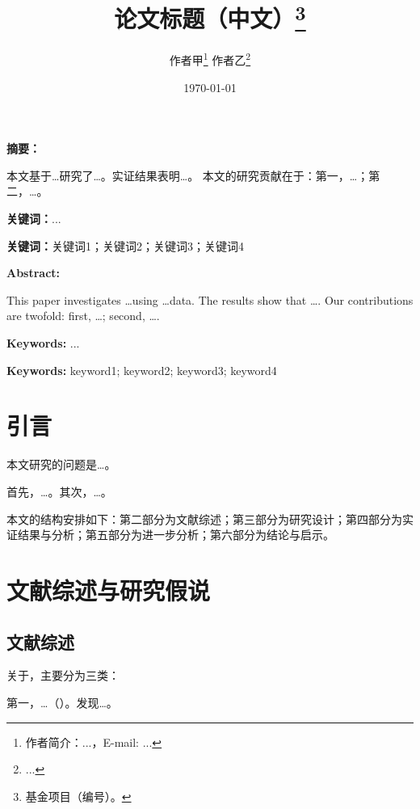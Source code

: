 \documentclass[lang=cn, alanguage={chinese}, aaffiliation={中国}, aoptions={authoryear}]{ctexart}
\title{论文标题（中文）\thanks{基金项目（编号）。}}
\author{作者甲\thanks{作者简介：...，E-mail: ...} \quad 作者乙\thanks{...}}
\date{\today}
\makeatletter
\newenvironment{cnabstract}{%
    \par\textbf{摘要：}
    \@tempswafalse
}{\par\vspace{\baselineskip}\par\textbf{关键词：}...}
\newenvironment{enabstract}{%
    \par\begin{minipage}{\textwidth}\textbf{Abstract: }
    }{%
    \end{minipage}\par\vspace{\baselineskip}\par\textbf{Keywords: }...}
\makeatother
\begin{document}
\thispagestyle{empty}

\maketitle
\thispagestyle{fancy}

\begin{cnabstract}
    本文基于\dots 研究了\dots。实证结果表明\dots。
    本文的研究贡献在于：第一，\dots；第二，\dots。
\end{cnabstract}

\textbf{关键词：}关键词1；关键词2；关键词3；关键词4

\begin{enabstract}
    This paper investigates \dots using \dots data.
    The results show that \dots. Our contributions are twofold: first, \dots;
    second, \dots.
\end{enabstract}

\textbf{Keywords:} keyword1; keyword2; keyword3; keyword4

\section{引言}
\label{sec:intro}

本文研究的问题是\dots。

首先，\dots。其次，\dots。

本文的结构安排如下：第二部分为文献综述；第三部分为研究设计；第四部分为实证结果与分析；第五部分为进一步分析；第六部分为结论与启示。

\section{文献综述与研究假说}
\label{sec:lit}

\subsection{文献综述}
\label{sec:lit:review}

关于，主要分为三类：

第一，\dots（\citealp{xxx}）。\citet{yyy}发现\dots。
\end{document}
